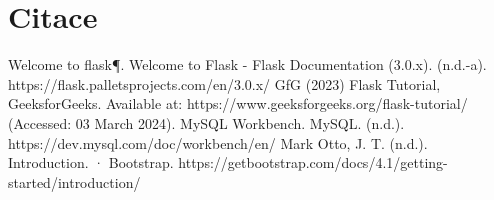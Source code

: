 \documentclass[11pt,a4paper,twoside,openright]{report}
\let\openright=\cleardoublepage
\begin{document}
\chapter{Citace}

Welcome to flask¶. Welcome to Flask - Flask Documentation (3.0.x). (n.d.-a). https://flask.palletsprojects.com/en/3.0.x/ 
GfG (2023) Flask Tutorial, GeeksforGeeks. Available at: https://www.geeksforgeeks.org/flask-tutorial/ (Accessed: 03 March 2024). 
MySQL Workbench. MySQL. (n.d.). https://dev.mysql.com/doc/workbench/en/ 
Mark Otto, J. T. (n.d.). Introduction. · Bootstrap. https://getbootstrap.com/docs/4.1/getting-started/introduction/ 

\nocite{einstein}\nocite{latexcompanion}\nocite{knuthwebsite}
\printbibliography[title={Seznam použité literatury},heading={bibintoc}]

\openright
\listoffigures
{}

\clearpage
\listoftables
{}


\end{document}
